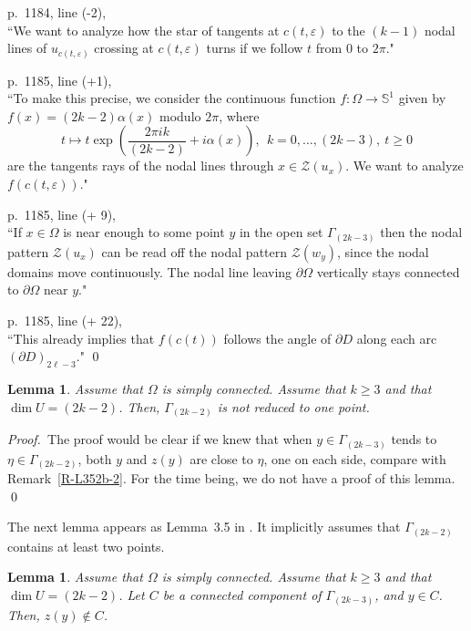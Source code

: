 \documentclass[12pt,a4paper]{amsart}
\theoremstyle{plain} %
\newtheorem{lemma}[theorem]{Lemma}
\theoremstyle{definition}
\numberwithin{equation}{section}
\numberwithin{figure}{section}
\numberwithin{table}{section}
\newcommand{\bS}{\mathbb{S}}
\newcommand{\cZ}{\mathcal{Z}}
\newcommand{\pf}{\emph{Proof.~}}
\begin{document}
p.~1184, line (-2),\\ ``We want to analyze how the star of tangents at $c(t,\varepsilon)$ to the $(k-1)$ nodal lines of $u_{c(t,\varepsilon)}$ crossing at $c(t,\varepsilon)$ turns if we follow $t$ from $0$ to $2\pi$."\smallskip

p.~1185, line (+1),\\ ``To make this precise, we consider the continuous function $f:\Omega \to \bS^1$ given by $f(x) = (2k-2)\alpha(x)$ modulo $2\pi$, where
%
$$
t \mapsto t \exp\left( \frac{2\pi i k}{(2k-2)} + i \alpha(x) \right), ~~k=0,\ldots , (2k-3), ~t\ge 0
$$
%
are the tangents rays of the nodal lines through $x \in \cZ(u_x)$. We want to analyze $f(c(t,\varepsilon))$."\smallskip

p.~1185, line (+ 9),\\ ``If $x \in \Omega$ is near enough to some point $y$ in the open set $\Gamma_{(2k-3)}$ then the nodal pattern $\cZ(u_x)$ can be read off the nodal pattern $\cZ(w_y)$, since the nodal domains move continuously. The nodal line leaving $\partial \Omega$ vertically stays connected to $\partial \Omega$ near $y$." \smallskip

p.~1185, line (+ 22),\\ ``This already implies that $f(c(t))$ follows the angle of $\partial D$ along each arc $(\partial D)_{2\ell -3}$." \medskip
\hfill \qed

\begin{lemma}\label{L-L35b1}
Assume that $\Omega$ is simply connected. Assume that  $k \ge 3$ and that $\dim U= (2k-2)$. Then,  $\Gamma_{(2k-2)}$ is not reduced to one point.
\end{lemma}

\pf The proof would be clear if we knew that  when $y \in \Gamma_{(2k-3)}$ tends to $\eta \in \Gamma_{(2k-2)}$, both $y$ and $z(y)$ are close to $\eta$, one on each side, compare with Remark~\ref{R-L352b-2}. For the time being, we do not have a proof of this lemma. \hfill \qed \medskip

The next lemma appears as Lemma~3.5 in \cite{HoMN1999}. It implicitly assumes that $\Gamma_{(2k-2)}$ contains at least two points.

\begin{lemma}\label{L-L35b2}
Assume that $\Omega$ is simply connected. Assume that  $k \ge 3$ and that $\dim U =(2k-2)$. Let $C$ be a connected component of $\Gamma_{(2k-3)}$, and $y \in C$. Then, $z(y) \not \in C$.
\end{lemma}%
\end{document}
